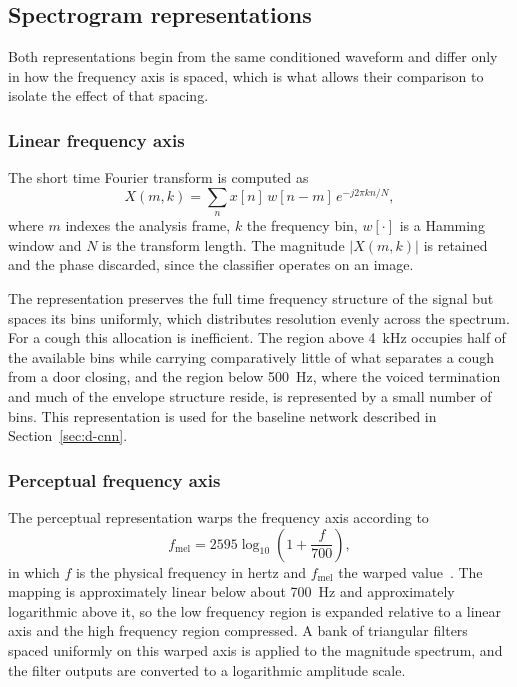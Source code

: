 \subsection{Spectrogram representations}\label{sec:d-spec}

Both representations begin from the same conditioned waveform and differ only
in how the frequency axis is spaced, which is what allows their comparison to
isolate the effect of that spacing.

\subsubsection{Linear frequency axis}\label{sec:d-stft}

The short time Fourier transform is computed as
\begin{equation}
X(m, k) = \sum_{n} x[n]\, w[n - m]\, e^{-j 2 \pi k n / N},
\label{eq:stft}
\end{equation}
where $m$ indexes the analysis frame, $k$ the frequency bin, $w[\cdot]$ is a
Hamming window and $N$ is the transform length. The magnitude $|X(m,k)|$ is
retained and the phase discarded, since the classifier operates on an image.

The representation preserves the full time frequency structure of the signal
but spaces its bins uniformly, which distributes resolution evenly across the
spectrum. For a cough this allocation is inefficient. The region above 4~kHz
occupies half of the available bins while carrying comparatively little of
what separates a cough from a door closing, and the region below 500~Hz, where
the voiced termination and much of the envelope structure reside, is
represented by a small number of bins. This representation is used for the
baseline network described in Section~\ref{sec:d-cnn}.

\subsubsection{Perceptual frequency axis}\label{sec:d-mel}

The perceptual representation warps the frequency axis according to
\begin{equation}
f_{\mathrm{mel}} = 2595 \log_{10}\!\left(1 + \frac{f}{700}\right),
\label{eq:mel}
\end{equation}
in which $f$ is the physical frequency in hertz and $f_{\mathrm{mel}}$ the
warped value~\cite{davis1980}. The mapping is approximately linear below
about 700~Hz and approximately logarithmic above it, so the low frequency
region is expanded relative to a linear axis and the high frequency region
compressed. A bank of triangular filters spaced uniformly on this warped axis
is applied to the magnitude spectrum, and the filter outputs are converted to
a logarithmic amplitude scale.

